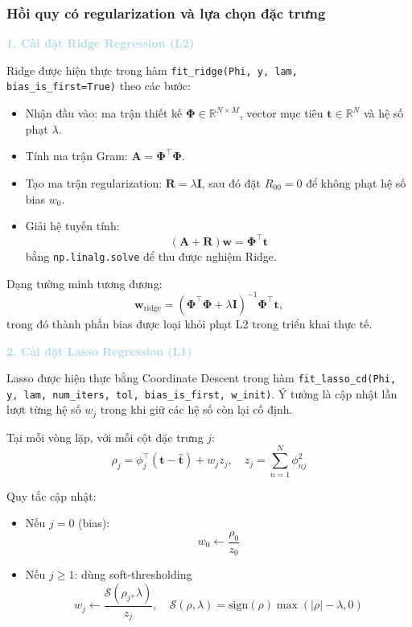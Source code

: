 \subsubsection{Hồi quy có regularization và lựa chọn đặc trưng}
\noindent\textcolor{lightblue}{\textbf{1. Cài đặt Ridge Regression (L2)}}

Ridge được hiện thực trong hàm \texttt{fit\_ridge(Phi, y, lam, bias\_is\_first=True)} theo các bước:
\begin{itemize} [labelsep=10pt, leftmargin=2cm]
    \item Nhận đầu vào: ma trận thiết kế $\mathbf{\Phi}\in\mathbb{R}^{N\times M}$, vector mục tiêu $\mathbf{t}\in\mathbb{R}^{N}$ và hệ số phạt $\lambda$.
    \item Tính ma trận Gram: $\mathbf{A}=\mathbf{\Phi}^{\top}\mathbf{\Phi}$.
    \item Tạo ma trận regularization: $\mathbf{R}=\lambda\mathbf{I}$, sau đó đặt $R_{00}=0$ để không phạt hệ số bias $w_0$.
    \item Giải hệ tuyến tính:
    \begin{equation}
    (\mathbf{A}+\mathbf{R})\mathbf{w}=\mathbf{\Phi}^{\top}\mathbf{t}
    \end{equation}
    bằng \texttt{np.linalg.solve} để thu được nghiệm Ridge.
\end{itemize}

Dạng tường minh tương đương:
\begin{equation}
\mathbf{w}_{\text{ridge}} = (\mathbf{\Phi}^{\top}\mathbf{\Phi}+\lambda\mathbf{I})^{-1}\mathbf{\Phi}^{\top}\mathbf{t},
\end{equation}
trong đó thành phần bias được loại khỏi phạt L2 trong triển khai thực tế.

\noindent\textcolor{lightblue}{\textbf{2. Cài đặt Lasso Regression (L1)}}

Lasso được hiện thực bằng Coordinate Descent trong hàm
\texttt{fit\_lasso\_cd(Phi, y, lam, num\_iters, tol, bias\_is\_first, w\_init)}.
Ý tưởng là cập nhật lần lượt từng hệ số $w_j$ trong khi giữ các hệ số còn lại cố định.

Tại mỗi vòng lặp, với mỗi cột đặc trưng $j$:
\begin{equation}
\rho_j = \phi_j^{\top}(\mathbf{t}-\hat{\mathbf{t}}) + w_j z_j,
\quad z_j = \sum_{n=1}^{N}\phi_{nj}^2
\end{equation}

Quy tắc cập nhật:
\begin{itemize} [labelsep=10pt, leftmargin=2cm]
    \item Nếu $j=0$ (bias):
    \begin{equation}
    w_0 \leftarrow \frac{\rho_0}{z_0}
    \end{equation}
    \item Nếu $j\geq 1$: dùng soft-thresholding
    \begin{equation}
    w_j \leftarrow \frac{\mathcal{S}(\rho_j,\lambda)}{z_j},
    \quad
    \mathcal{S}(\rho,\lambda)=\mathrm{sign}(\rho)\max(|\rho|-\lambda,0)
    \end{equation}
\end{itemize}

